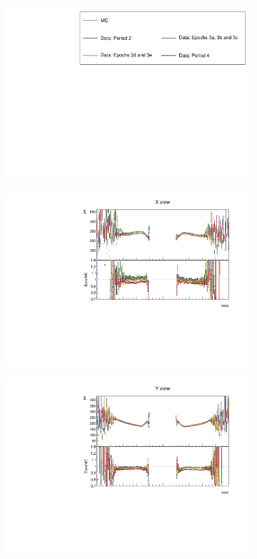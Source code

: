 \documentclass[12pt,a4paper]{article}
\begin{document}
\begin{figure}[!ht]
  \begin{subfigure}{\textwidth}
    \centering
    \includegraphics[height=0.2\linewidth]{essentialsec_tb/legend.pdf}
  \end{subfigure}
  \vspace*{2mm}
  
  \begin{subfigure}{0.5\textwidth}
    \includegraphics[width=\linewidth]{PlotsAngularDistribution/pe_cosz_x.pdf}
  \end{subfigure}
  \begin{subfigure}{0.5\textwidth}
    \includegraphics[width=\linewidth]{PlotsAngularDistribution/pe_cosz_y.pdf}

\end{subfigure}
\end{figure}
\end{document}
